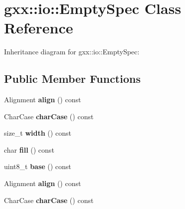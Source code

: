 \hypertarget{classgxx_1_1io_1_1EmptySpec}{}\section{gxx\+:\+:io\+:\+:Empty\+Spec Class Reference}
\label{classgxx_1_1io_1_1EmptySpec}


Inheritance diagram for gxx\+:\+:io\+:\+:Empty\+Spec\+:
\subsection*{Public Member Functions}
\begin{DoxyCompactItemize}
\item 
Alignment {\bfseries align} () const \hypertarget{classgxx_1_1io_1_1EmptySpec_aea647109fcd983c2dd48a5dd55e768fa}{}\label{classgxx_1_1io_1_1EmptySpec_aea647109fcd983c2dd48a5dd55e768fa}

\item 
Char\+Case {\bfseries char\+Case} () const \hypertarget{classgxx_1_1io_1_1EmptySpec_ac81567b47cbfcf4d96e8d3044f48ccd5}{}\label{classgxx_1_1io_1_1EmptySpec_ac81567b47cbfcf4d96e8d3044f48ccd5}

\item 
size\+\_\+t {\bfseries width} () const \hypertarget{classgxx_1_1io_1_1EmptySpec_a4ca4033e8409d934c762f5c8c6c13a46}{}\label{classgxx_1_1io_1_1EmptySpec_a4ca4033e8409d934c762f5c8c6c13a46}

\item 
char {\bfseries fill} () const \hypertarget{classgxx_1_1io_1_1EmptySpec_aa5f6882502c0bb1b73785029c4a54072}{}\label{classgxx_1_1io_1_1EmptySpec_aa5f6882502c0bb1b73785029c4a54072}

\item 
uint8\+\_\+t {\bfseries base} () const \hypertarget{classgxx_1_1io_1_1EmptySpec_ad9da604f2910a176e53ba009d0f9fc98}{}\label{classgxx_1_1io_1_1EmptySpec_ad9da604f2910a176e53ba009d0f9fc98}

\item 
Alignment {\bfseries align} () const \hypertarget{classgxx_1_1io_1_1EmptySpec_aea647109fcd983c2dd48a5dd55e768fa}{}\label{classgxx_1_1io_1_1EmptySpec_aea647109fcd983c2dd48a5dd55e768fa}

\item 
Char\+Case {\bfseries char\+Case} () const \hypertarget{classgxx_1_1io_1_1EmptySpec_ac81567b47cbfcf4d96e8d3044f48ccd5}{}\label{classgxx_1_1io_1_1EmptySpec_ac81567b47cbfcf4d96e8d3044f48ccd5}


\end{DoxyCompactItemize}
